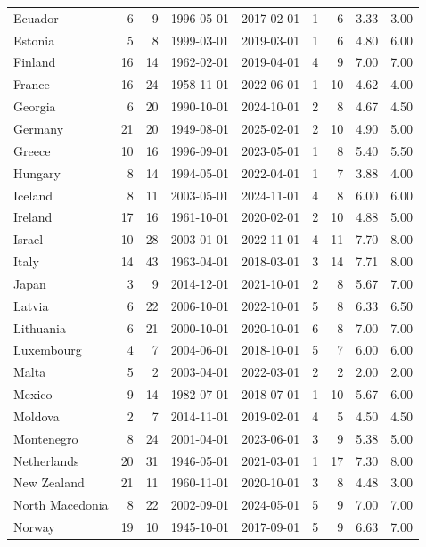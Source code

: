 {\begin{longtable}{lrrrrrrrr}
Ecuador & 6 & 9 & 1996-05-01 & 2017-02-01 & 1 & 6 & 3.33 & 3.00 \\
Estonia & 5 & 8 & 1999-03-01 & 2019-03-01 & 1 & 6 & 4.80 & 6.00 \\
Finland & 16 & 14 & 1962-02-01 & 2019-04-01 & 4 & 9 & 7.00 & 7.00 \\
France & 16 & 24 & 1958-11-01 & 2022-06-01 & 1 & 10 & 4.62 & 4.00 \\
Georgia & 6 & 20 & 1990-10-01 & 2024-10-01 & 2 & 8 & 4.67 & 4.50 \\
Germany & 21 & 20 & 1949-08-01 & 2025-02-01 & 2 & 10 & 4.90 & 5.00 \\
Greece & 10 & 16 & 1996-09-01 & 2023-05-01 & 1 & 8 & 5.40 & 5.50 \\
Hungary & 8 & 14 & 1994-05-01 & 2022-04-01 & 1 & 7 & 3.88 & 4.00 \\
Iceland & 8 & 11 & 2003-05-01 & 2024-11-01 & 4 & 8 & 6.00 & 6.00 \\
Ireland & 17 & 16 & 1961-10-01 & 2020-02-01 & 2 & 10 & 4.88 & 5.00 \\
Israel & 10 & 28 & 2003-01-01 & 2022-11-01 & 4 & 11 & 7.70 & 8.00 \\
Italy & 14 & 43 & 1963-04-01 & 2018-03-01 & 3 & 14 & 7.71 & 8.00 \\
Japan & 3 & 9 & 2014-12-01 & 2021-10-01 & 2 & 8 & 5.67 & 7.00 \\
Latvia & 6 & 22 & 2006-10-01 & 2022-10-01 & 5 & 8 & 6.33 & 6.50 \\
Lithuania & 6 & 21 & 2000-10-01 & 2020-10-01 & 6 & 8 & 7.00 & 7.00 \\
Luxembourg & 4 & 7 & 2004-06-01 & 2018-10-01 & 5 & 7 & 6.00 & 6.00 \\
Malta & 5 & 2 & 2003-04-01 & 2022-03-01 & 2 & 2 & 2.00 & 2.00 \\
Mexico & 9 & 14 & 1982-07-01 & 2018-07-01 & 1 & 10 & 5.67 & 6.00 \\
Moldova & 2 & 7 & 2014-11-01 & 2019-02-01 & 4 & 5 & 4.50 & 4.50 \\
Montenegro & 8 & 24 & 2001-04-01 & 2023-06-01 & 3 & 9 & 5.38 & 5.00 \\
Netherlands & 20 & 31 & 1946-05-01 & 2021-03-01 & 1 & 17 & 7.30 & 8.00 \\
New Zealand & 21 & 11 & 1960-11-01 & 2020-10-01 & 3 & 8 & 4.48 & 3.00 \\
North Macedonia & 8 & 22 & 2002-09-01 & 2024-05-01 & 5 & 9 & 7.00 & 7.00 \\
Norway & 19 & 10 & 1945-10-01 & 2017-09-01 & 5 & 9 & 6.63 & 7.00 \\

\end{longtable}}
